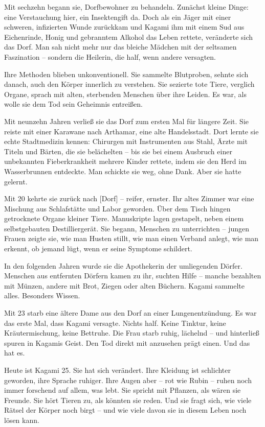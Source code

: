 \documentclass[12pt,a4paper]{article}
\begin{document}
Mit sechzehn begann sie, Dorfbewohner zu behandeln. Zunächst kleine Dinge: eine Verstauchung hier, ein Insektengift da. Doch als ein Jäger mit einer schweren, infizierten Wunde zurückkam und Kagami ihm mit einem Sud aus Eichenrinde, Honig und gebranntem Alkohol das Leben rettete, veränderte sich das Dorf. Man sah nicht mehr nur das bleiche Mädchen mit der seltsamen Faszination – sondern die Heilerin, die half, wenn andere versagten.

Ihre Methoden blieben unkonventionell. Sie sammelte Blutproben, sehnte sich danach, auch den Körper innerlich zu verstehen. Sie sezierte tote Tiere, verglich Organe, sprach mit alten, sterbenden Menschen über ihre Leiden. Es war, als wolle sie dem Tod sein Geheimnis entreißen.

Mit neunzehn Jahren verließ sie das Dorf zum ersten Mal für längere Zeit. Sie reiste mit einer Karawane nach Arthamar, eine alte Handelsstadt. Dort lernte sie echte Stadtmedizin kennen: Chirurgen mit Instrumenten aus Stahl, Ärzte mit Titeln und Bärten, die sie belächelten – bis sie bei einem Ausbruch einer unbekannten Fieberkrankheit mehrere Kinder rettete, indem sie den Herd im Wasserbrunnen entdeckte. Man schickte sie weg, ohne Dank. Aber sie hatte gelernt.

Mit 20 kehrte sie zurück nach [Dorf] – reifer, ernster. Ihr altes Zimmer war eine Mischung aus Schlafstätte und Labor geworden. Über dem Tisch hingen getrocknete Organe kleiner Tiere. Manuskripte lagen gestapelt, neben einem selbstgebauten Destilliergerät. Sie begann, Menschen zu unterrichten – jungen Frauen zeigte sie, wie man Husten stillt, wie man einen Verband anlegt, wie man erkennt, ob jemand lügt, wenn er seine Symptome schildert.

In den folgenden Jahren wurde sie die Apothekerin der umliegenden Dörfer. Menschen aus entfernten Dörfern kamen zu ihr, suchten Hilfe – manche bezahlten mit Münzen, andere mit Brot, Ziegen oder alten Büchern. Kagami sammelte alles. Besonders Wissen.

Mit 23 starb eine ältere Dame aus den Dorf an einer Lungenentzündung. Es war das erste Mal, dass Kagami versagte. Nichts half. Keine Tinktur, keine Kräutermischung, keine Bettruhe. Die Frau starb ruhig, lächelnd – und hinterließ spuren in Kagamis Geist. Den Tod direkt mit anzusehen prägt einen. Und das hat es.

Heute ist Kagami 25. Sie hat sich verändert. Ihre Kleidung ist schlichter geworden, ihre Sprache ruhiger. Ihre Augen aber – rot wie Rubin – ruhen noch immer forschend auf allem, was lebt. Sie spricht mit Pflanzen, als wären sie Freunde. Sie hört Tieren zu, als könnten sie reden. Und sie fragt sich, wie viele Rätsel der Körper noch birgt – und wie viele davon sie in diesem Leben noch lösen kann.
\end{document}
